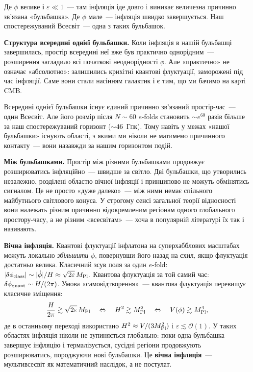 \documentclass[12pt, a4paper]{article}
\begin{document}
Де $\phi$ велике і $\varepsilon \ll 1$~--- там інфляція іде довго
і виникає величезна причинно зв'язана «бульбашка». Де $\phi$ мале~---
інфляція швидко завершується. Наш спостережуваний Всесвіт~---
одна з таких бульбашок.

\textbf{Структура всередині однієї бульбашки.} Коли інфляція
в нашій бульбашці завершилась, простір всередині неї вже був
практично однорідним~--- розширення загладило всі початкові
неоднорідності $\phi$. Але «практично» не означає «абсолютно»:
залишились крихітні квантові флуктуації, заморожені під час
інфляції. Саме вони стали насінням галактик і є тим, що ми
бачимо на карті CMB.

Всередині однієї бульбашки існує єдиний причинно зв'язаний
простір-час~--- один Всесвіт. Але його розмір після $N \sim 60$
$e$-folds становить $\sim e^{60}$ разів більше за наш
спостережуваний горизонт ($\sim 46$~Гпк). Тому навіть у
межах «нашої бульбашки» існують області, з якими ми ніколи
не матимемо причинного контакту~--- вони назавжди за
нашим горизонтом подій.

\textbf{Між бульбашками.} Простір між різними бульбашками
продовжує розширюватись інфляційно~--- швидше за світло.
Дві бульбашки, що утворились незалежно, розділені областю
вічної інфляції і принципово не можуть обмінятись сигналом.
Це не просто «дуже далеко»~--- між ними немає спільного
майбутнього світлового конуса. У строгому сенсі загальної теорії відносності вони
належать різним причинно відокремленим регіонам
одного глобального простору-часу, а не різним «всесвітам»~---
хоча в популярній літературі їх так і називають.

\textbf{Вічна інфляція.} Квантові флуктуації інфлатона на
суперхабблових масштабах можуть локально \emph{збільшити} $\phi$,
повернувши його назад на схил, якщо флуктуація достатньо велика.
Класичний зсув поля за один $e$-fold: $|\delta\phi_{\rm class}|
\sim |\dot\phi|/H \approx \sqrt{2\varepsilon}\,M_{\rm Pl}$.
Квантова флуктуація за той самий час: $\delta\phi_{\rm quant}
\sim H/(2\pi)$. Умова «самовідтворення»~---
квантова флуктуація перевищує класичне зміщення:
\begin{equation*}
  \frac{H}{2\pi} \gtrsim \sqrt{2\varepsilon}\,M_{\rm Pl}
  \quad\Leftrightarrow\quad
  H^2 \gtrsim M_{\rm Pl}^2
  \quad\Leftrightarrow\quad
  V(\phi) \gtrsim M_{\rm Pl}^4,
\end{equation*}
де в останньому переході використано $H^2 \approx V/(3M_{\rm Pl}^2)$
і $\varepsilon \lesssim \mathcal{O}(1)$.
У таких областях інфляція ніколи не зупиняється глобально:
поки одна бульбашка завершує інфляцію і термалізується,
сусідні регіони продовжують розширюватись, породжуючи нові
бульбашки. Це \textbf{вічна інфляція}~--- мультивсесвіт
як математичний наслідок, а не постулат.
\end{document}
